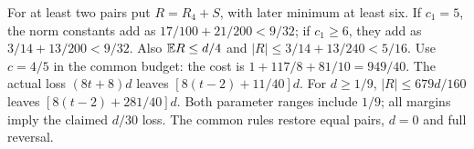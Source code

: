 For at least two pairs put $R=R_4+S$, with later minimum at least six.
If $c_1=5$, the norm constants add as $17/100+21/200<9/32$;
if $c_1\ge6$, they add as $3/14+13/200<9/32$.
Also $\mathbb E R\le d/4$ and $|R|\le3/14+13/240<5/16$.
Use $c=4/5$ in the common budget: the cost is
$1+117/8+81/10=949/40$.
The actual loss $(8t+8)d$ leaves $[8(t-2)+11/40]d$.
For $d\ge1/9$, $|R|\le679d/160$ leaves
$[8(t-2)+281/40]d$.
Both parameter ranges include $1/9$; all margins imply the claimed
$d/30$ loss. The common rules restore equal pairs, $d=0$ and full reversal.
